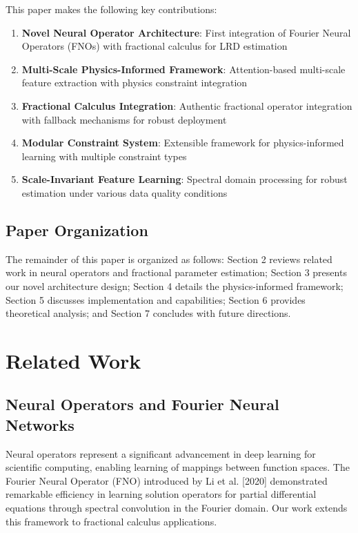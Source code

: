 \documentclass[11pt,a4paper]{article}
\begin{document}
This paper makes the following key contributions:

\begin{enumerate}
    \item \textbf{Novel Neural Operator Architecture}: First integration of Fourier Neural Operators (FNOs) with fractional calculus for LRD estimation
    \item \textbf{Multi-Scale Physics-Informed Framework}: Attention-based multi-scale feature extraction with physics constraint integration
    \item \textbf{Fractional Calculus Integration}: Authentic fractional operator integration with fallback mechanisms for robust deployment
    \item \textbf{Modular Constraint System}: Extensible framework for physics-informed learning with multiple constraint types
    \item \textbf{Scale-Invariant Feature Learning}: Spectral domain processing for robust estimation under various data quality conditions
\end{enumerate}

\subsection{Paper Organization}

The remainder of this paper is organized as follows: Section 2 reviews related work in neural operators and fractional parameter estimation; Section 3 presents our novel architecture design; Section 4 details the physics-informed framework; Section 5 discusses implementation and capabilities; Section 6 provides theoretical analysis; and Section 7 concludes with future directions.

\section{Related Work}

\subsection{Neural Operators and Fourier Neural Networks}

Neural operators represent a significant advancement in deep learning for scientific computing, enabling learning of mappings between function spaces. The Fourier Neural Operator (FNO) introduced by Li et al. [2020] demonstrated remarkable efficiency in learning solution operators for partial differential equations through spectral convolution in the Fourier domain. Our work extends this framework to fractional calculus applications.
\end{document}
